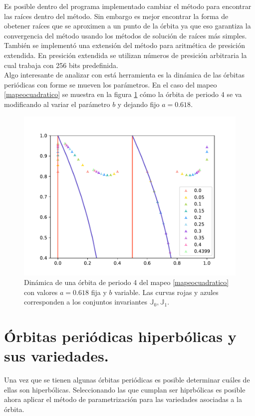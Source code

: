 Es posible dentro del programa implementado cambiar el m\'etodo para encontrar las ra\'ices dentro del m\'etodo. Sin embargo es mejor encontrar la forma de obetener ra\'ices que se aproximen a un punto de la \'orbita  ya que eso garantiza la convergencia del m\'etodo usando los m\'etodos de soluci\'on de ra\'ices m\'as simples. Tambi\'en se implement\'o una extensi\'on del m\'etodo para aritm\'etica de presici\'on extendida. En presici\'on extendida se utilizan n\'umeros de presici\'on arbitraria la cual trabaja con 256 bits predefinida. \\

Algo interesante de analizar con est\'a herramienta es la din\'amica de las \'orbitas peri\'odicas con forme se mueven los par\'ametros. En el caso del mapeo \eqref{mapeocuadratico} se muestra en la figura  \ref{grafmapeocuadraper4variable} c\'omo la \'orbita de periodo 4 se va modificando al variar el par\'ametro $b$ y dejando fijo $a=0.618$.

\begin{figure}[H]
	\centering
	\includegraphics[scale=0.7]{MapeoCuadraP5b}
	\caption{Din\'amica de una \'orbita de periodo 4 del mapeo \eqref{mapeocuadratico} con valores $a=0.618$ fija y $b$ variable. Las curvas rojas y azules corresponden a los conjuntos invariantes $\mathbb{J}_{0}, \mathbb{J}_{1}$. }
	\label{grafmapeocuadraper4variable}
\end{figure}

\section{\'Orbitas peri\'odicas hiperb\'olicas y sus variedades.}
Una vez que se tienen algunas \'orbitas peri\'odicas es posible determinar cu\'ales de ellas son hiperb\'olicas. Seleccionando las que cumplan ser hiprb\'olicas es posible ahora aplicar el m\'etodo de parametrizaci\'on para las variedades asociadas a la \'orbita. \\

